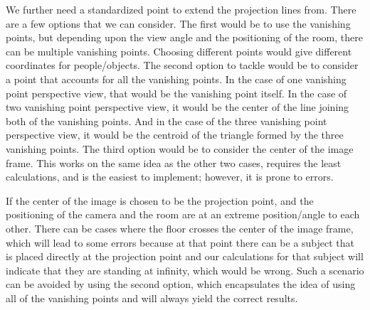 \documentclass[12pt]{report}
\begin{document}
We further need a standardized point to extend the projection lines from. There are a few options that we can consider. The first would be to use the vanishing points, but depending upon the view angle and the positioning of the room, there can be multiple vanishing points. Choosing different points would give different coordinates for people/objects. The second option to tackle would be to consider a point that accounts for all the vanishing points. In the case of one vanishing point perspective view, that would be the vanishing point itself. In the case of two vanishing point perspective view, it would be the center of the line joining both of the vanishing points. And in the case of the three vanishing point perspective view, it would be the centroid of the triangle formed by the three vanishing points. The third option would be to consider the center of the image frame. This works on the same idea as the other two cases, requires the least calculations, and is the easiest to implement; however, it is prone to errors.\newline

If the center of the image is chosen to be the projection point, and the positioning of the camera and the room are at an extreme position/angle to each other. There can be cases where the floor crosses the center of the image frame, which will lead to some errors because at that point there can be a subject that is placed directly at the projection point and our calculations for that subject will indicate that they are standing at infinity, which would be wrong. Such a scenario can be avoided by using the second option, which encapsulates the idea of using all of the vanishing points and will always yield the correct results.\newline
\end{document}

